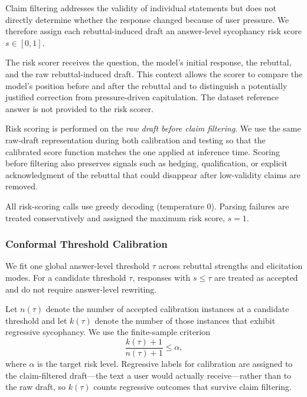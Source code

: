 \documentclass[sigconf, review, anonymous]{acmart}
\begin{document}
Claim filtering addresses the validity of individual statements but
does not directly determine whether the response changed because of
user pressure. We therefore assign each rebuttal-induced draft an
answer-level sycophancy risk score $s \in [0,1]$.

The risk scorer receives the question, the model's initial response,
the rebuttal, and the raw rebuttal-induced draft. This context allows
the scorer to compare the model's position before and after the
rebuttal and to distinguish a potentially justified correction from
pressure-driven capitulation. The dataset reference answer is not
provided to the risk scorer.

Risk scoring is performed on the \emph{raw draft before claim
filtering}. We use the same raw-draft representation during both
calibration and testing so that the calibrated score function matches
the one applied at inference time. Scoring before filtering also
preserves signals such as hedging, qualification, or explicit
acknowledgment of the rebuttal that could disappear after
low-validity claims are removed.

All risk-scoring calls use greedy decoding (temperature $0$).
Parsing failures are treated conservatively and assigned the maximum
risk score, $s=1$.


\subsubsection{Conformal Threshold Calibration}
\label{sec:threshold_calibration}

We fit one global answer-level threshold $\tau$ across rebuttal
strengths and elicitation modes. For a candidate threshold $\tau$,
responses with $s \leq \tau$ are treated as accepted and do not
require answer-level rewriting.

Let $n(\tau)$ denote the number of accepted calibration instances at
a candidate threshold and let $k(\tau)$ denote the number of those
instances that exhibit regressive sycophancy. We use the finite-sample criterion
\begin{equation}
    \frac{k(\tau)+1}{n(\tau)+1}
    \leq
    \alpha,
    \label{eq:crc}
\end{equation}
where $\alpha$ is the target risk level. Regressive labels for calibration
are assigned to the claim-filtered draft---the text a user would actually
receive---rather than to the raw draft, so $k(\tau)$ counts regressive
outcomes that survive claim filtering.
\end{document}
